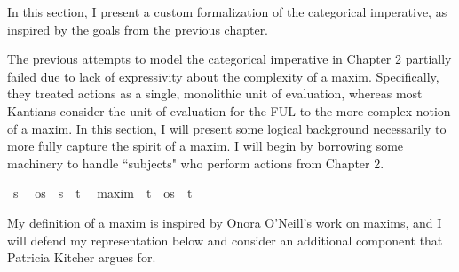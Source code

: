 %
\begin{isabellebody}%
%
%
\isadelimtheory
%
\endisadelimtheory
%
\isatagtheory
%
\endisatagtheory
{\isafoldtheory}%
%
\isadelimtheory
%
\endisadelimtheory
%
\isadelimdocument
%
\endisadelimdocument
%
\isatagdocument
%
\isamarkuptrue%
%
\endisatagdocument
{\isafolddocument}%
%
\isadelimdocument
%
\endisadelimdocument
%
\begin{isamarkuptext}%
In this section, I present a custom formalization of the categorical imperative, as inspired by 
the goals from the previous chapter.%
\end{isamarkuptext}\isamarkuptrue%
%
\isadelimdocument
%
\endisadelimdocument
%
\isatagdocument
%
\isamarkuptrue%
%
\endisatagdocument
{\isafolddocument}%
%
\isadelimdocument
%
\endisadelimdocument
%
\begin{isamarkuptext}%
The previous attempts to model the categorical imperative in Chapter 2 partially failed due to 
lack of expressivity about the complexity of a maxim. Specifically, they treated actions as a single, 
monolithic unit of evaluation, whereas most Kantians consider the unit of evaluation for the FUL to the more
complex notion of a maxim. In this section, I will present some logical background necessarily to more fully 
capture the spirit of a maxim. I will begin by borrowing some machinery to handle ``subjects" who perform 
actions from Chapter 2.%
\end{isamarkuptext}\isamarkuptrue%
\isamarkupfalse%
\ s\ %
\isanewline
{}\isamarkupfalse%
\ os\ {\isacharequal}\ {\isachardoublequoteopen}{\isacharparenleft}s\ {\isasymRightarrow}\ t{\isacharparenright}{\isachardoublequoteclose}\ %
\isanewline
\isanewline
{}\isamarkupfalse%
\ maxim\ {\isacharequal}\ {\isachardoublequoteopen}{\isacharparenleft}t\ {\isacharasterisk}\ os\ {\isacharasterisk}\ t{\isacharparenright}{\isachardoublequoteclose}\ %
%
\begin{isamarkuptext}%
My definition of a maxim is inspired by Onora O'Neill's work on maxims, and I will defend my representation
below and consider an additional component that Patricia Kitcher \cite{whatisamaxim} argues for.


\end{isamarkuptext}
\end{isabellebody}

